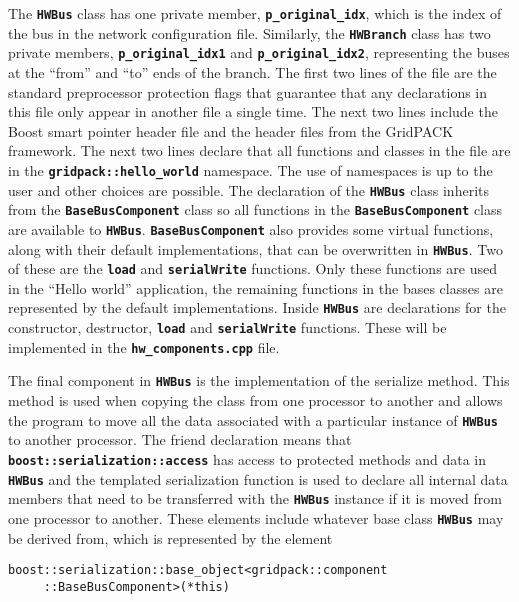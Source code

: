The \texttt{\textbf{HWBus}} class has one private member, \texttt{\textbf{p\_original\_idx}}, which is the index of the bus in the network configuration file. Similarly, the \texttt{\textbf{HWBranch}} class has two private members, \texttt{\textbf{p\_original\_idx1}} and \texttt{\textbf{p\_original\_idx2}}, representing the buses at the ``from'' and ``to'' ends of the branch. The first two lines of the file are the standard preprocessor protection flags that guarantee that any declarations in this file only appear in another file a single time. The next two lines include the Boost smart pointer header file and the header files from the GridPACK framework. The next two lines declare that all functions and classes in the file are in the \texttt{\textbf{gridpack::hello\_world}} namespace. The use of namespaces is up to the user and other choices are possible. The declaration of the \texttt{\textbf{HWBus}} class inherits from the \texttt{\textbf{BaseBusComponent}} class so all functions in the \texttt{\textbf{BaseBusComponent}} class are available to \texttt{\textbf{HWBus}}. \texttt{\textbf{BaseBusComponent}} also provides some virtual functions, along with their default implementations, that can be overwritten in \texttt{\textbf{HWBus}}. Two of these are the \texttt{\textbf{load}} and \texttt{\textbf{serialWrite}} functions. Only these functions are used in the ``Hello world'' application, the remaining functions in the bases classes are represented by the default implementations. Inside \texttt{\textbf{HWBus}} are declarations for the constructor, destructor, \texttt{\textbf{load}} and \texttt{\textbf{serialWrite}} functions. These will be implemented in the \texttt{\textbf{hw\_components.cpp}} file.

The final component in \texttt{\textbf{HWBus}} is the implementation of the
serialize method. This method is used when copying the class from one processor
to another and allows the program to move all the data associated with a
particular instance of \texttt{\textbf{HWBus}} to another processor. The friend
declaration means that \texttt{\textbf{boost::serialization::access}} has access
to protected methods and data in \texttt{\textbf{HWBus}} and the templated
serialization function is used to declare all internal data members that need to
be transferred with the \texttt{\textbf{HWBus}} instance if it is moved from one processor to another. These elements include whatever base class \texttt{\textbf{HWBus}} may be derived from, which is represented by the element

{
\color{red}
\begin{Verbatim}[fontseries=b]
boost::serialization::base_object<gridpack::component
     ::BaseBusComponent>(*this)
\end{Verbatim}
}

